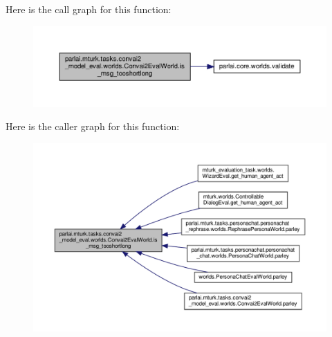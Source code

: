 Here is the call graph for this function\+:
\nopagebreak
\begin{figure}[H]
\begin{center}
\leavevmode
\includegraphics[width=350pt]{classparlai_1_1mturk_1_1tasks_1_1convai2__model__eval_1_1worlds_1_1Convai2EvalWorld_a71bd41e61be058353520917731662a3d_cgraph}
\end{center}
\end{figure}
Here is the caller graph for this function\+:
\nopagebreak
\begin{figure}[H]
\begin{center}
\leavevmode
\includegraphics[width=350pt]{classparlai_1_1mturk_1_1tasks_1_1convai2__model__eval_1_1worlds_1_1Convai2EvalWorld_a71bd41e61be058353520917731662a3d_icgraph}
\end{center}
\end{figure}
\mbox{\label{classparlai_1_1mturk_1_1tasks_1_1convai2__model__eval_1_1worlds_1_1Convai2EvalWorld_a88eef2bcb0b78f250ba0035df4975652}} 
